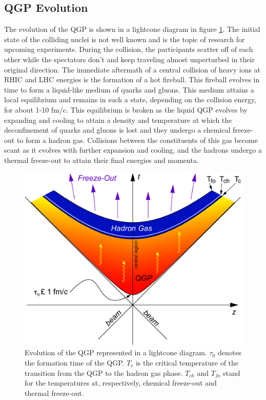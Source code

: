 \subsection{QGP Evolution}
The evolution of the QGP is shown in a lightcone diagram in figure \ref{fig:lightcone}.
The initial state of the colliding nuclei is not well known and is the topic of research for upcoming experiments. During the collision, the participants scatter off of each other while the spectators don't and keep traveling almost unperturbed in their original direction. The immediate aftermath of a central collision of heavy ions at RHIC and LHC energies is the formation of a hot fireball. This fireball evolves in time to form a liquid-like medium of quarks and gluons. This medium attains a local equilibrium and remains in such a state, depending on the collision energy, for about 1-10 fm/c. This equilibrium is broken as the liquid QGP evolves by expanding and cooling to attain a density and temperature at which the deconfinement of quarks and gluons is lost and they undergo a chemical freeze-out to form a hadron gas. Collisions between the constituents of this gas become scant as it evolves with further expansion and cooling, and the hadrons undergo a thermal freeze-out to attain their final energies and momenta. 
\begin{figure}[h]
  \centering
  \includegraphics[width=6.5in]{figures/LightCone1_color-crop_NThesis.pdf}
  \caption{Evolution of the QGP represented in a lightcone diagram. $\tau_{0}$ denotes the formation time of the QGP. $T_{c}$ is the critical temperature of the transition from the QGP to the hadron gas phase. $T_{ch}$ and $T_{fo}$ stand for the temperatures at, respectively, chemical freeze-out and thermal freeze-out. \cite{Connors:2017ptx}}\label{fig:lightcone}
\end{figure}

